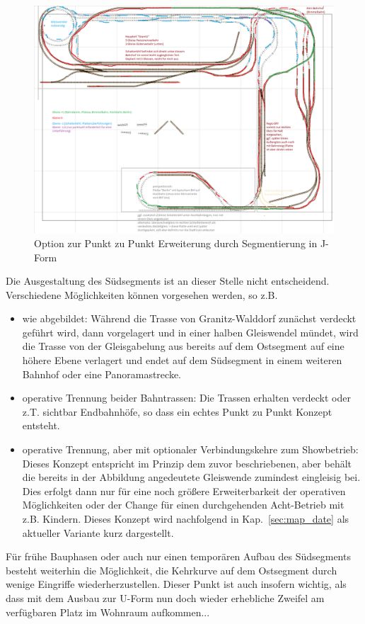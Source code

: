 \begin{figure}[h]
\centering
  \includegraphics[width=1.0\textwidth]{img/map_evolution/state3_granitz_modules.png}
	\caption{Option zur Punkt zu Punkt Erweiterung durch Segmentierung in J-Form}
	\label{img:state3_granitz_modules}
\end{figure}

Die Ausgestaltung des S\"udsegments ist an dieser Stelle nicht entscheidend.
Verschiedene M\"oglichkeiten k\"onnen vorgesehen werden, so z.B.
\begin{itemize}
	\item wie abgebildet:
	W\"ahrend die Trasse von Granitz-Walddorf zun\"achst verdeckt gef\"uhrt wird, dann vorgelagert und in einer halben Gleiswendel m\"undet, wird die Trasse von der Gleisgabelung aus bereits auf dem Ostsegment auf eine h\"ohere Ebene verlagert und endet auf dem S\"udsegment in einem weiteren Bahnhof oder eine Panoramastrecke.
	\item operative Trennung beider Bahntrassen:
	Die Trassen erhalten verdeckt oder z.T. sichtbar Endbahnh\"ofe, so dass ein echtes Punkt zu Punkt Konzept entsteht.
	\item operative Trennung, aber mit optionaler Verbindungskehre zum Showbetrieb:
	Dieses Konzept entspricht im Prinzip dem zuvor beschriebenen, aber beh\"alt die bereits in der Abbildung angedeutete Gleiswende zumindest eingleisig bei.
	Dies erfolgt dann nur f\"ur eine noch gr\"o{\ss}ere Erweiterbarkeit der operativen M\"oglichkeiten oder der Change f\"ur einen durchgehenden Acht-Betrieb mit z.B. Kindern.
	Dieses Konzept wird nachfolgend in Kap.~\ref{sec:map_date} als aktueller Variante kurz dargestellt.
\end{itemize}
F\"ur fr\"uhe Bauphasen oder auch nur einen tempor\"aren Aufbau des S\"udsegments besteht weiterhin die M\"oglichkeit, die Kehrkurve auf dem Ostsegment durch wenige Eingriffe wiederherzustellen.
Dieser Punkt ist auch insofern wichtig, als dass mit dem Ausbau zur U-Form nun doch wieder erhebliche Zweifel am verf\"ugbaren Platz im Wohnraum aufkommen...

